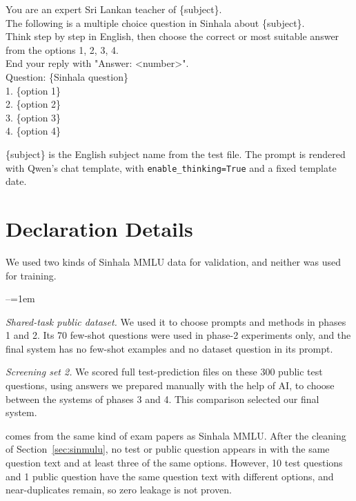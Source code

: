 \smallskip
{\footnotesize\ttfamily\raggedright\noindent
You are an expert Sri Lankan teacher of \{subject\}.\\
The following is a multiple choice question in Sinhala about \{subject\}.\\
Think step by step in English, then choose the correct or most suitable answer from the options 1, 2, 3, 4.\\
End your reply with "Answer: <number>".\\[2pt]
Question: \{Sinhala question\}\\
1. \{option 1\}\\
2. \{option 2\}\\
3. \{option 3\}\\
4. \{option 4\}\par}

\smallskip\noindent\{subject\} is the English subject name from the test file. The prompt is rendered with Qwen's chat template, with \texttt{enable\_thinking=True} and a fixed template date.

\section{Declaration Details}\label{app:decl}
 We used two kinds of Sinhala MMLU data for validation, and neither was used for training.

\begin{list}{--}{\leftmargin=1em\itemindent=0pt\itemsep=1pt\parsep=0pt\topsep=2pt}
\item \emph{Shared-task public dataset.} We used it to choose prompts and methods in phases 1 and 2. Its 70 few-shot questions were used in phase-2 experiments only, and the final system has no few-shot examples and no dataset question in its prompt.
\item \emph{Screening set 2.} We scored full test-prediction files on these 300 public test questions, using answers we prepared manually with the help of AI, to choose between the systems of phases 3 and 4. This comparison selected our final system.
\end{list}

 \sinmulu{} comes from the same kind of exam papers as Sinhala MMLU. After the cleaning of Section~\ref{sec:sinmulu}, no test or public question appears in \sinmulu{} with the same question text and at least three of the same options. However, 10 test questions and 1 public question have the same question text with different options, and near-duplicates remain, so zero leakage is not proven.

